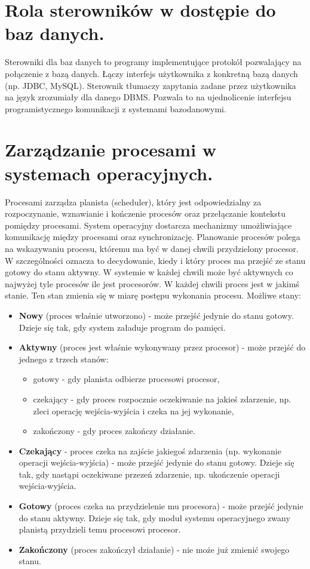 \documentclass[12pt,a4paper]{article}
\begin{document}
	\section{Rola sterowników w dostępie do baz danych.}
	Sterowniki dla baz danych to programy implementujące protokół pozwalający na połączenie z bazą danych. Łączy interfejs użytkownika z konkretną bazą danych (np. JDBC, MySQL). Sterownik tłumaczy zapytania zadane przez użytkownika na język zrozumiały dla danego DBMS. Pozwala to na ujednolicenie interfejsu programistycznego komunikacji z systemami bazodanowymi.

	\section{Zarządzanie procesami w systemach operacyjnych.}
	Procesami zarządza planista (scheduler), który jest odpowiedzialny za rozpoczynanie, wznawianie i kończenie procesów oraz przełączanie kontekstu pomiędzy procesami. System operacyjny dostarcza mechanizmy umożliwiające komunikację między procesami oraz synchronizację. Planowanie procesów polega na wskazywaniu procesu, któremu ma być w danej chwili przydzielony procesor. W szczególności oznacza to decydowanie, kiedy i który proces ma przejść ze stanu gotowy do stanu aktywny. W systemie w każdej chwili może być aktywnych co najwyżej tyle procesów ile jest procesorów. W każdej chwili proces jest w jakimś stanie. Ten stan zmienia się w miarę postępu wykonania procesu. Możliwe stany:
	
	\begin{itemize}
		\item \textbf{Nowy} (proces właśnie utworzono) - może przejść jedynie do stanu gotowy. Dzieje się tak, gdy system załaduje program do pamięci.
		\item \textbf{Aktywny} (proces jest właśnie wykonywany przez procesor) - może przejść do jednego z trzech stanów:
		\begin{itemize}
			\item gotowy - gdy planista odbierze procesowi procesor,
			\item czekający - gdy proces rozpocznie oczekiwanie na jakieś zdarzenie, np. zleci operację wejścia-wyjścia i czeka na jej wykonanie,
			\item zakończony - gdy proces zakończy działanie.
		\end{itemize}
		\item \textbf{Czekający} - proces czeka na zajście jakiegoś zdarzenia (np. wykonanie operacji wejścia-wyjścia) -  może przejść jedynie do stanu gotowy. Dzieje się tak, gdy nastąpi oczekiwane przezeń zdarzenie, np. ukończenie operacji wejścia-wyjścia.
		\item \textbf{Gotowy} (proces czeka na przydzielenie mu procesora) - może przejść jedynie do stanu aktywny. Dzieje się tak, gdy moduł systemu operacyjnego zwany planistą przydzieli temu procesowi procesor.
		\item \textbf{Zakończony} (proces zakończył działanie) - nie może już zmienić swojego stanu.
	\end{itemize}
\end{document}
